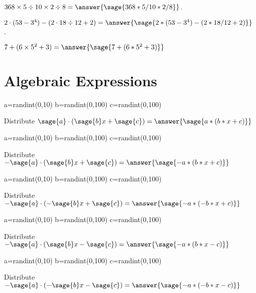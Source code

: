 \documentclass{ximera}
\begin{document}
\begin{problem}
$368\times 5 \div 10 \times 2\div 8=\answer{\sage{368*5/10*2/8}}$.
\end{problem}


\begin{problem}
$2\cdot(53-3^4)-(2\cdot 18\div 12+2)=\answer{\sage{2*(53-3^4)-(2*18/12+2)}}$.

\end{problem}



\begin{problem}
$ 7 + (6 \times 5^2 + 3) =\answer{\sage{7+(6*5^2+3)}} $
\end{problem}

\section*{Algebraic Expressions}

\begin{problem}
\begin{sagesilent}
a=randint(0,10)
b=randint(0,100)
c=randint(0,100)
\end{sagesilent}
Distribute $\sage{a}\cdot (\sage{b}x+\sage{c})=\answer{\sage{a*(b*x+c)}}$
\end{problem}

\begin{problem}
\begin{sagesilent}
a=randint(0,10)
b=randint(0,100)
c=randint(0,100)
\end{sagesilent}
Distribute $-\sage{a}\cdot (\sage{b}x+\sage{c})=\answer{\sage{-a*(b*x+c)}}$
\end{problem}

\begin{problem}
\begin{sagesilent}
a=randint(0,10)
b=randint(0,100)
c=randint(0,100)
\end{sagesilent}
Distribute $-\sage{a}\cdot (-\sage{b}x+\sage{c})=\answer{\sage{-a*(-b*x+c)}}$
\end{problem}

\begin{problem}
\begin{sagesilent}
a=randint(0,10)
b=randint(0,100)
c=randint(0,100)
\end{sagesilent}
Distribute $-\sage{a}\cdot (\sage{b}x-\sage{c})=\answer{\sage{-a*(b*x-c)}}$
\end{problem}

\begin{problem}
\begin{sagesilent}
a=randint(0,10)
b=randint(0,100)
c=randint(0,100)
\end{sagesilent}
Distribute $-\sage{a}\cdot (-\sage{b}x-\sage{c})=\answer{\sage{-a*(-b*x-c)}}$
\end{problem}
\end{document}
